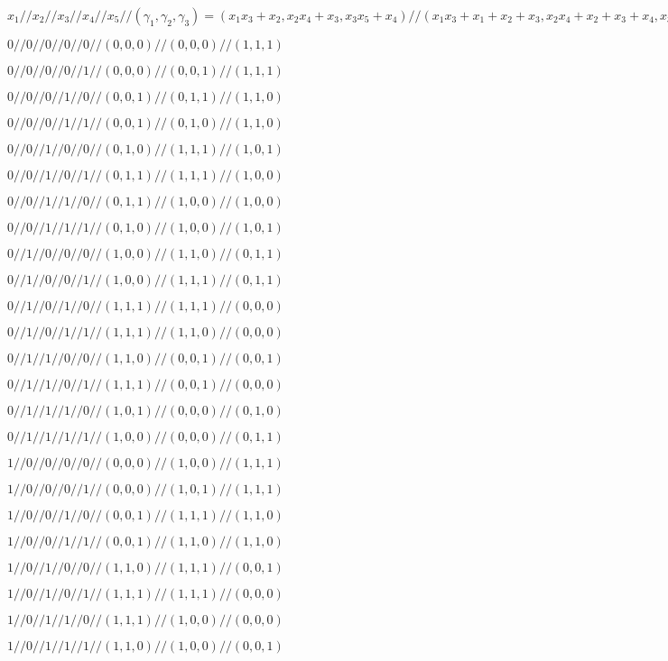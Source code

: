 \documentclass[utf8x, 14pt]{G7-32} %
\begin{document}
$x_1 // x_2 // x_3 // x_4 // x_5 // (\gamma_1,\gamma_2,\gamma_3) = (x_1 x_3 + x_2, x_2 x_4 + x_3, x_3 x_5 + x_4) // (x_1 x_3+x_1+x_2+x_3, x_2 x_4+x_2+x_3+x_4, x_3 x_5+x_3+x_4+x_5) // (x_1 x_3+x_2+1, x_2 x_4+x_3+1, x_3 x_5+x_4+1)$

$0 // 0 // 0 // 0 // 0 // (0,0,0) // (0,0,0) // (1,1,1)$

$0 // 0 // 0 // 0 // 1 // (0,0,0) // (0,0,1) // (1,1,1)$

$0 // 0 // 0 // 1 // 0 // (0,0,1) // (0,1,1) // (1,1,0)$

$0 // 0 // 0 // 1 // 1 // (0,0,1) // (0,1,0) // (1,1,0)$

$0 // 0 // 1 // 0 // 0 // (0,1,0) // (1,1,1) // (1,0,1)$

$0 // 0 // 1 // 0 // 1 // (0,1,1) // (1,1,1) // (1,0,0)$

$0 // 0 // 1 // 1 // 0 // (0,1,1) // (1,0,0) // (1,0,0)$

$0 // 0 // 1 // 1 // 1 // (0,1,0) // (1,0,0) // (1,0,1)$

$0 // 1 // 0 // 0 // 0 // (1,0,0) // (1,1,0) // (0,1,1)$

$0 // 1 // 0 // 0 // 1 // (1,0,0) // (1,1,1) // (0,1,1)$

$0 // 1 // 0 // 1 // 0 // (1,1,1) // (1,1,1) // (0,0,0)$

$0 // 1 // 0 // 1 // 1 // (1,1,1) // (1,1,0) // (0,0,0)$

$0 // 1 // 1 // 0 // 0 // (1,1,0) // (0,0,1) // (0,0,1)$

$0 // 1 // 1 // 0 // 1 // (1,1,1) // (0,0,1) // (0,0,0)$

$0 // 1 // 1 // 1 // 0 // (1,0,1) // (0,0,0) // (0,1,0)$

$0 // 1 // 1 // 1 // 1 // (1,0,0) // (0,0,0) // (0,1,1)$

$1 // 0 // 0 // 0 // 0 // (0,0,0) // (1,0,0) // (1,1,1)$

$1 // 0 // 0 // 0 // 1 // (0,0,0) // (1,0,1) // (1,1,1)$

$1 // 0 // 0 // 1 // 0 // (0,0,1) // (1,1,1) // (1,1,0)$

$1 // 0 // 0 // 1 // 1 // (0,0,1) // (1,1,0) // (1,1,0)$

$1 // 0 // 1 // 0 // 0 // (1,1,0) // (1,1,1) // (0,0,1)$

$1 // 0 // 1 // 0 // 1 // (1,1,1) // (1,1,1) // (0,0,0)$

$1 // 0 // 1 // 1 // 0 // (1,1,1) // (1,0,0) // (0,0,0)$

$1 // 0 // 1 // 1 // 1 // (1,1,0) // (1,0,0) // (0,0,1)$
\end{document}
